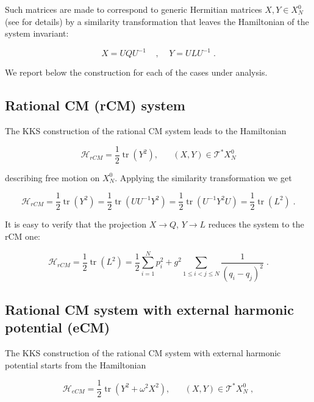 Such matrices are made to correspond to generic Hermitian matrices $X, Y \in X_N^0$ (see \cite{olshanetskyperelomov} for details) by a similarity transformation that leaves the Hamiltonian of the system invariant:

\begin{equation}
    X = UQU^{-1}\;\;\;\;,\;\;\;\;Y = ULU^{-1}\;.
\end{equation}

We report below the construction for each of the cases under analysis.

\subsection{Rational CM (rCM) system}
The KKS construction of the rational CM system leads to the Hamiltonian

\begin{equation}
    \mathcal{H}_{rCM} = \frac{1}{2}\operatorname{tr}(Y^2), \;\;\;\;\;\;(X,Y) \in \mathcal{T}^\ast X^0_N
\end{equation}

describing free motion on $X^0_N$. Applying the similarity transformation we get

\begin{equation}
    \mathcal{H}_{rCM} = \frac{1}{2}\operatorname{tr}(Y^2) = \frac{1}{2}\operatorname{tr}(UU^{-1}Y^2) = \frac{1}{2}\operatorname{tr}(U^{-1} Y^2 U) = \frac{1}{2}\operatorname{tr}(L^2)\;.
\end{equation}

It is easy to verify that the projection $X \to Q$, $Y \to L$ reduces the system to the rCM one:
    
\begin{equation}
    \mathcal{H}_{rCM} = \frac{1}{2}\operatorname{tr}(L^2) = \frac{1}{2}\sum_{i=1}^N p_i^2 + g^2 \sum_{1 \leq i < j \leq N} \frac{1}{(q_i - q_j)^2}\;.
\end{equation}

\subsection{Rational CM system with external harmonic potential (eCM)}
The KKS construction of the rational CM system with external harmonic potential starts from the Hamiltonian

\begin{equation}
    \mathcal{H}_{eCM} = \frac{1}{2}\operatorname{tr}(Y^2 + \omega^2 X^2), \;\;\;\;\;\;(X,Y) \in \mathcal{T}^\ast X^0_N\;,
\end{equation}

